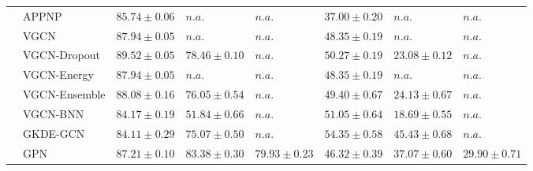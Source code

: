 \begin{table}[ht]
{\begin{tabular}{ll|lll|lll}
         &          APPNP &    $85.74 \pm 0.06$ &               $n.a.$ &                $n.a.$ &   $37.00 \pm 0.20$ &              $n.a.$ &               $n.a.$ \\
         &           VGCN &    $87.94 \pm 0.05$ &               $n.a.$ &                $n.a.$ &   $48.35 \pm 0.19$ &              $n.a.$ &               $n.a.$ \\
         &   VGCN-Dropout &    $\mathbf{89.52 \pm 0.05}$ &    $78.46 \pm 0.10$ &                $n.a.$ &   $50.27 \pm 0.19$ &   $23.08 \pm 0.12$ &               $n.a.$ \\
         &    VGCN-Energy &    $87.94 \pm 0.05$ &               $n.a.$ &                $n.a.$ &   $48.35 \pm 0.19$ &              $n.a.$ &               $n.a.$ \\
         &  VGCN-Ensemble &    $88.08 \pm 0.16$ &    $76.05 \pm 0.54$ &                $n.a.$ &   $49.40 \pm 0.67$ &   $24.13 \pm 0.67$ &               $n.a.$ \\
         &       VGCN-BNN &    $84.17 \pm 0.19$ &    $51.84 \pm 0.66$ &                $n.a.$ &   $51.05 \pm 0.64$ &   $18.69 \pm 0.55$ &               $n.a.$ \\
         &        GKDE-GCN &    $84.11 \pm 0.29$ &    $75.07 \pm 0.50$ &                $n.a.$ &   $\mathbf{54.35 \pm 0.58}$ &   $45.43 \pm 0.68$ &               $n.a.$ \\
         &            GPN &    $87.21 \pm 0.10$ &    $83.38 \pm 0.30$ &     $79.93 \pm 0.23$ &   $46.32 \pm 0.39$ &   $37.07 \pm 0.60$ &    $29.90 \pm 0.71$ \\
          
          \midrule
          

\end{tabular}}
\end{table}
